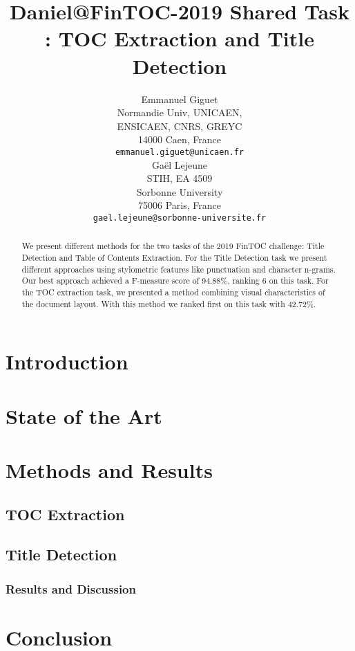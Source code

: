 \documentclass[11pt,a4paper]{article}
\title{Daniel@FinTOC-2019 Shared Task : TOC Extraction and Title Detection}
\author{\hspace{-2.2cm}Emmanuel Giguet \\
  \hspace{-2.2cm}Normandie Univ, UNICAEN, \\
  \hspace{-2.2cm} ENSICAEN, CNRS, GREYC\\
  \hspace{-2.2cm}14000 Caen, France\\
  \hspace{-2.2cm}\texttt{emmanuel.giguet@unicaen.fr} \\\And
  Ga\"el Lejeune \\
  STIH, EA 4509\\
  Sorbonne University\\
  75006 Paris, France\\
  \texttt{gael.lejeune@sorbonne-universite.fr} \\}
\begin{document}
\maketitle
\begin{abstract}
We present different methods for the two tasks of the 2019 FinTOC challenge: Title Detection and Table of Contents Extraction.
For the Title Detection task we present different approaches using stylometric features like punctuation and character n-grams. Our best approach achieved a F-measure score of 94.88\%, ranking 6 on this task.
For the TOC extraction task, we presented a method combining visual characteristics of the document layout. With this method we ranked first on this task with 42.72\%.
\end{abstract}

\section{Introduction}


\section{State of the Art}
\label{sec:soa}


\section{Methods and Results}
\label{sec:meth}

\subsection{TOC Extraction}
\label{sec:TOC}


\subsection{Title Detection}
\label{sec:title}


\subsubsection{Results and Discussion}
\label{sec:disc}


\section{Conclusion}
\label{sec:conclusion}

\end{document}
